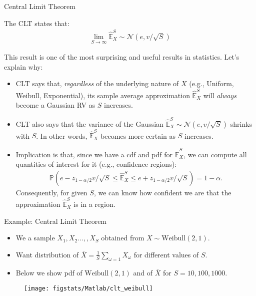 \documentclass[9pt]{beamer}
\begin{document}
%
\begin{frame}{Central Limit Theorem}

\begin{block}{}
The CLT states that:
\begin{align*}
\lim_{S\to \infty}\hat{\mathbb{E}}_X^S\sim \mathcal{N}(e,v/\sqrt{S})
\end{align*}
\end{block}

This result is one of the most surprising and useful results in statistics. Let's explain why:

\begin{itemize}

\item CLT says that, {\em regardless} of the underlying nature of $X$ (e.g., Uniform, Weibull, Exponential), its sample average approximation $\hat{\mathbb{E}}_X^S$ will {\em always} become a Gaussian RV as $S$ increases.  

\item CLT also says that the variance of the Gaussian $\hat{\mathbb{E}}_X^S\sim \mathcal{N}(e,v/\sqrt{S})$ shrinks with $S$. In other words, $\hat{\mathbb{E}}_X^S$ becomes more certain as $S$ increases.

\item Implication is that, since we have a cdf and pdf for $\hat{\mathbb{E}}_X^S$, we can compute all quantities of interest for it (e.g., confidence regions):
\begin{align*}
\mathbb{P}\left(e-z_{1-\alpha/2}v/\sqrt{S}\leq \hat{\mathbb{E}}_X^S\leq e+z_{1-\alpha/2}v/\sqrt{S}\right)=1-\alpha.
\end{align*}
Consequently, for given $S$, we can know how confident we are that the approximation $\hat{\mathbb{E}}_X^S$ is in a region.  

\end{itemize}


\end{frame}

%
\begin{frame}{Example: Central Limit Theorem}

\begin{itemize}
\item We a sample $X_1,X_2...,,X_S$ obtained from $X\sim \textrm{Weibull}(2,1)$.
\item Want distribution of $\bar{X}=\frac{1}{S}\sum_{\omega=1}X_\omega$ for different values of $S$.
\item Below we show pdf of $\textrm{Weibull}(2,1)$ and of $\bar{X}$ for $S=10,100,1000$.
\end{itemize}
\begin{figure}[!htb]
    \centering
	\texttt{[image: figstats/Matlab/clt\_weibull]}
\end{figure}
\end{frame}
\end{document}

